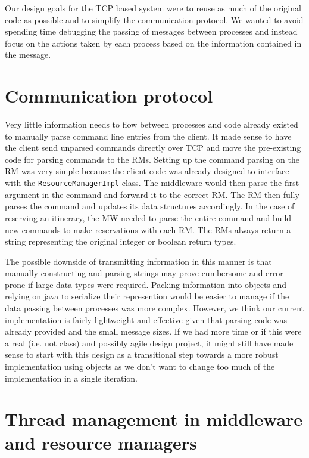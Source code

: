 \documentclass{article}
\begin{document}
Our design goals for the TCP based system were to reuse as much of the original code as possible and to simplify the communication protocol. 
We wanted to avoid spending time debugging the passing of messages between processes and instead focus on the actions taken by each process based on the information contained in the message. 

\section{Communication protocol}
Very little information needs to flow between processes and code already existed to manually parse command line entries from the client. 
It made sense to have the client send unparsed commands directly over TCP and move the pre-existing code for parsing commands to the RMs. 
Setting up the command parsing on the RM was very simple because the client code was already designed to interface with the \texttt{ResourceManagerImpl} class.  
The middleware would then parse the first argument in the command and forward it to the correct RM. 
The RM then fully parses the command and updates its data structures accordingly. 
In the case of reserving an itinerary, the MW needed to parse the entire command and build new commands to make reservations with each RM. 
The RMs always return a string representing the original integer or boolean return types. 

The possible downside of transmitting information in this manner is that manually constructing and parsing strings may prove cumbersome and error prone if large data types were required. 
Packing information into objects and relying on java to serialize their represention would be easier to manage if the data passing between processes was more complex. 
However, we think our current implementation is fairly lightweight and effective given that parsing code was already provided and the small message sizes. 
If we had more time or if this were a real (i.e. not class) and possibly agile design project, it might still have made sense to start with this design as a transitional step towards a more robust implementation using objects as we don't want to change too much of the implementation in a single iteration. 
 



\section{Thread management in middleware and resource managers}
\end{document}
